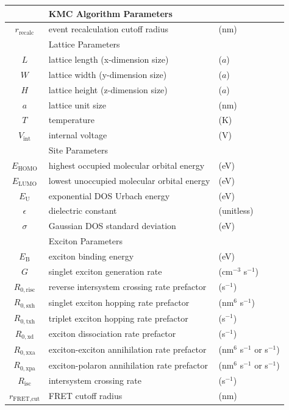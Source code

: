 \documentclass[%
 reprint,onecolumn,notitlepage,
superscriptaddress,longbibliography,
 amsmath,amssymb,
 aps,rmp,floatfix,
]{revtex4-1}
\begin{document}
\begin{center}
\begin{tabular}{ c l l }
\hline
 & KMC Algorithm Parameters & \\
 \hline
$r_{\text{recalc}}$ & event recalculation cutoff radius & (nm) \\
\hline
 & Lattice Parameters & \\
\hline
$L$ & lattice length (x-dimension size) & ($a$) \\
$W$ & lattice width (y-dimension size) & ($a$) \\
$H$ & lattice height (z-dimension size) & ($a$) \\
$a$ & lattice unit size & (nm) \\
$T$ & temperature & (K) \\
$V_\text{int}$ & internal voltage & (V) \\
\hline
& Site Parameters & \\
\hline
$E_\text{HOMO}$ & highest occupied molecular orbital energy & (eV) \\
$E_\text{LUMO}$ & lowest unoccupied molecular orbital energy & (eV) \\
$E_\text{U}$ & exponential DOS Urbach energy & (eV) \\
$\epsilon$ & dielectric constant & (unitless) \\
$\sigma$ & Gaussian DOS standard deviation & (eV) \\
\hline
 & Exciton Parameters & \\
 \hline
$E_\text{B}$ & exciton binding energy & (eV) \\
$G$ & singlet exciton generation rate & (cm$^{-3}$ s$^{-1}$) \\
$R_{0,\text{risc}}$ & reverse intersystem crossing rate prefactor & (s$^{-1}$) \\
$R_{0,\text{sxh}}$ & singlet exciton hopping rate prefactor & (nm$^6$ s$^{-1}$) \\
$R_{0,\text{txh}}$ & triplet exciton hopping rate prefactor & (s$^{-1}$) \\
$R_{0,\text{xd}}$ & exciton dissociation rate prefactor & (s$^{-1}$) \\
$R_{0,\text{xxa}}$ & exciton-exciton annihilation rate prefactor & (nm$^{6}$ s$^{-1}$ or s$^{-1}$) \\
$R_{0,\text{xpa}}$ & exciton-polaron annihilation rate prefactor & (nm$^{6}$ s$^{-1}$ or s$^{-1}$) \\ 
$R_{\text{isc}}$ & intersystem crossing rate & (s$^{-1}$) \\
$r_{\text{FRET,cut}}$ & FRET cutoff radius & (nm) \\

\end{tabular}
\end{center}
\end{document}
